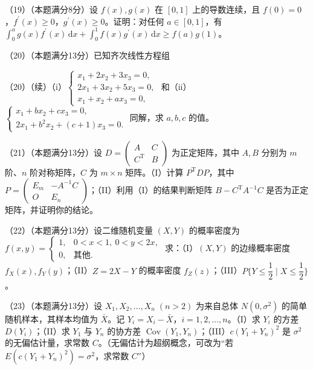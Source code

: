\documentclass[UTF8,12pt]{ctexart}
\begin{document}
（19）（本题满分8分）设 \(\displaystyle f(x),\allowbreak g(x)\) 在 \(\displaystyle [0,\allowbreak 1]\) 上的导数连续，且 \(\displaystyle f(0)=0\)，\(\displaystyle f^{\prime}(x)\ge0\)，\(\displaystyle g^{\prime}(x)\ge0\)。证明：对任何 \(\displaystyle a\in[0,\allowbreak 1]\)，有 \(\displaystyle \int_0^ag(x)f^{\prime}(x)\,\mathrm dx+\displaystyle \int_0^1f(x)g^{\prime}(x)\,\mathrm dx\ge f(a)g(1)\)。


（20）（本题满分13分）已知齐次线性方程组


（20）（续）（i）\(\displaystyle \begin{cases}x_1+2x_2+3x_3=0,\allowbreak \\2x_1+3x_2+5x_3=0,\allowbreak \\x_1+x_2+ax_3=0,\allowbreak \end{cases}\) 和（ii）\(\displaystyle \begin{cases}x_1+bx_2+cx_3=0,\allowbreak \\2x_1+b^2x_2+(c+1)x_3=0.\end{cases}\) 同解，求 \(\displaystyle a,\allowbreak b,\allowbreak c\) 的值。


（21）（本题满分13分）设 \(\displaystyle D=\begin{pmatrix}A&C\\C^{\mathrm T}&B\end{pmatrix}\) 为正定矩阵，其中 \(\displaystyle A,\allowbreak B\) 分别为 \(\displaystyle m\) 阶、\(\displaystyle n\) 阶对称矩阵，\(\displaystyle C\) 为 \(\displaystyle m\times n\) 矩阵。（I）计算 \(\displaystyle P^{\mathrm T}DP\)，其中 \(\displaystyle P=\begin{pmatrix}E_m&-A^{-1}C\\O&E_n\end{pmatrix}\)；（II）利用（I）的结果判断矩阵 \(\displaystyle B-C^{\mathrm T}A^{-1}C\) 是否为正定矩阵，并证明你的结论。


（22）（本题满分13分）设二维随机变量 \(\displaystyle (X,\allowbreak Y)\) 的概率密度为 \(\displaystyle f(x,\allowbreak y)=\begin{cases}1,\allowbreak &0<x<1,\allowbreak \ 0<y<2x,\allowbreak \\0,\allowbreak &\text{其他}.\end{cases}\) 求：（I）\(\displaystyle (X,\allowbreak Y)\) 的边缘概率密度 \(\displaystyle f_X(x),\allowbreak f_Y(y)\)；（II）\(\displaystyle Z=2X-Y\) 的概率密度 \(\displaystyle f_Z(z)\)；（III）\(\displaystyle P\{Y\le\dfrac{\displaystyle 1}{\displaystyle 2}\mid X\le\dfrac{\displaystyle 1}{\displaystyle 2}\}\)。


（23）（本题满分13分）设 \(\displaystyle X_1,\allowbreak X_2,\allowbreak \ldots,\allowbreak X_n\;(n>2)\) 为来自总体 \(\displaystyle N(0,\allowbreak \sigma^2)\) 的简单随机样本，其样本均值为 \(\displaystyle \bar X\)。记 \(\displaystyle Y_i=X_i-\bar X\)，\(\displaystyle i=1,\allowbreak 2,\allowbreak \ldots,\allowbreak n\)。（I）求 \(\displaystyle Y_i\) 的方差 \(\displaystyle D(Y_i)\)；（II）求 \(\displaystyle Y_1\) 与 \(\displaystyle Y_n\) 的协方差 \(\displaystyle \operatorname{Cov}(Y_1,\allowbreak Y_n)\)；（III）\(\displaystyle c(Y_1+Y_n)^2\) 是 \(\displaystyle \sigma^2\) 的无偏估计量，求常数 \(\displaystyle C\)。（无偏估计为超纲概念，可改为“若 \(\displaystyle E(c(Y_1+Y_n)^2)=\sigma^2\)，求常数 \(\displaystyle C\)”）
\end{document}
